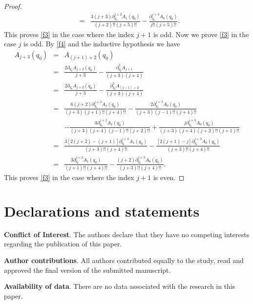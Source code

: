 \documentclass[reqno,11pt]{amsart}
\numberwithin{equation}{section}
\theoremstyle{definition}
\begin{document}
\begin{proof}
\begin{eqnarray*}
		&=& \frac{3 (j+3) \partial_{q_0}^{j+2}A_1(q_0)}{(j+2)!! (j+5)!!}- \frac{\partial_{q_0}^{j+3}A_0(q_0)}{j!! (j+5)!!}.
	\end{eqnarray*}
	\endgroup
	This proves \eqref{f3} in the case where the index $j+1$ is odd. Now we prove \eqref{f3} in the case $j$ is odd. By \eqref{f4} and the inductive hypothesis we have
					\begingroup\allowdisplaybreaks
	\begin{eqnarray*}
		A_{j+3}(q_0)&=& A_{(j+1)+2}(q_0)\\
		&=& \frac{2 \partial_{q_0} A_{j+2}(q_0)}{j+3}-\frac{\partial_{q_0}^2 A_{j+1}}{(j+3)(j+4)}\\
		&=& \frac{2 \partial_{q_0} A_{j+2}(q_0)}{j+3}-\frac{\partial_{q_0}^2 A_{(j-1)+2}}{(j+3)(j+4)}\\
		&=& \frac{6(j+2) \partial_{q_0}^{j+2}A_1(q_0)}{(j+3)(j+1)!! (j+4)!!}-\frac{2 \partial_{q_0}^{j+3}A_0(q_0)}{(j+3)(j-1)!!(j+4)!!}\\
		&&- \frac{3 \partial_{q_0}^{j+2}A_1(q_0)}{(j+3)(j+4)(j-1)!!(j+2)!!}+ \frac{j \partial_{q_0}^{j+3} A_0(q_0)}{(j+3) (j+4) (j+2)!! (j+1)!!}\\
		&=& \frac{3[2(j+2)-(j+1)] \partial_{q_0}^{j+2} A_1(q_0)}{(j+3)!! (j+4)!!}- \frac{[2(j+1)-j] \partial_{q_0}^{j+3}A_0(q_0)}{(j+3)!!(j+4)!!}\\
		&=&\frac{3 \partial_{q_0}^{j+2} A_1(q_0)}{(j+1)!! (j+4)!!}- \frac{(j+2) \partial_{q_0}^{j+3}A_0(q_0)}{(j+3)!!(j+4)!!}.
	\end{eqnarray*}
	\endgroup
	This proves \eqref{f3} in the case where the index $j+1$ is even.
	
	
	
\end{proof}

\section*{Declarations and statements}

{\bf Conflict of Interest}. The authors declare that they have no competing interests regarding the publication of this paper.

{\bf Author contributions}. All authors contributed equally to the study, read and approved the final version of the submitted manuscript.

{\bf Availability of data}. There are no data associated with the research in this paper.

\end{document}
